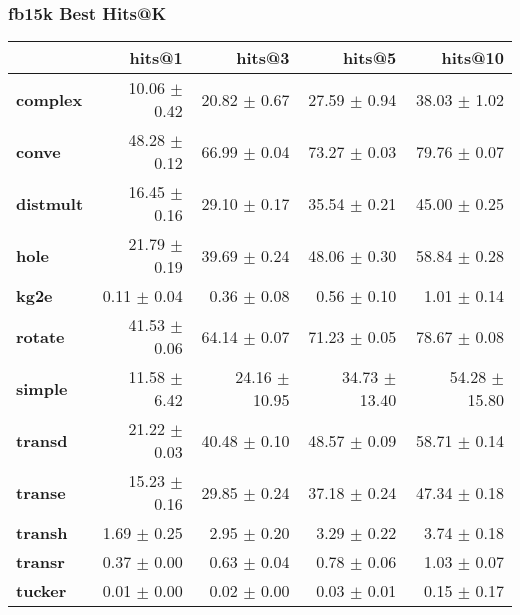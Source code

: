 \documentclass{article}
\begin{document}
\subsubsection{fb15k Best Hits@K}
    \begin{center}
    \begin{tabular}{lrrrr}
\toprule
{} &        hits@1 &         hits@3 &         hits@5 &        hits@10 \\
\midrule
\textbf{complex } &  10.06 $\pm$ 0.42 &   20.82 $\pm$ 0.67 &   27.59 $\pm$ 0.94 &   38.03 $\pm$ 1.02 \\
\textbf{conve   } &  48.28 $\pm$ 0.12 &   66.99 $\pm$ 0.04 &   73.27 $\pm$ 0.03 &   79.76 $\pm$ 0.07 \\
\textbf{distmult} &  16.45 $\pm$ 0.16 &   29.10 $\pm$ 0.17 &   35.54 $\pm$ 0.21 &   45.00 $\pm$ 0.25 \\
\textbf{hole    } &  21.79 $\pm$ 0.19 &   39.69 $\pm$ 0.24 &   48.06 $\pm$ 0.30 &   58.84 $\pm$ 0.28 \\
\textbf{kg2e    } &   0.11 $\pm$ 0.04 &    0.36 $\pm$ 0.08 &    0.56 $\pm$ 0.10 &    1.01 $\pm$ 0.14 \\
\textbf{rotate  } &  41.53 $\pm$ 0.06 &   64.14 $\pm$ 0.07 &   71.23 $\pm$ 0.05 &   78.67 $\pm$ 0.08 \\
\textbf{simple  } &  11.58 $\pm$ 6.42 &  24.16 $\pm$ 10.95 &  34.73 $\pm$ 13.40 &  54.28 $\pm$ 15.80 \\
\textbf{transd  } &  21.22 $\pm$ 0.03 &   40.48 $\pm$ 0.10 &   48.57 $\pm$ 0.09 &   58.71 $\pm$ 0.14 \\
\textbf{transe  } &  15.23 $\pm$ 0.16 &   29.85 $\pm$ 0.24 &   37.18 $\pm$ 0.24 &   47.34 $\pm$ 0.18 \\
\textbf{transh  } &   1.69 $\pm$ 0.25 &    2.95 $\pm$ 0.20 &    3.29 $\pm$ 0.22 &    3.74 $\pm$ 0.18 \\
\textbf{transr  } &   0.37 $\pm$ 0.00 &    0.63 $\pm$ 0.04 &    0.78 $\pm$ 0.06 &    1.03 $\pm$ 0.07 \\
\textbf{tucker  } &   0.01 $\pm$ 0.00 &    0.02 $\pm$ 0.00 &    0.03 $\pm$ 0.01 &    0.15 $\pm$ 0.17 \\
\bottomrule
\end{tabular}

    \end{center}
\end{document}

